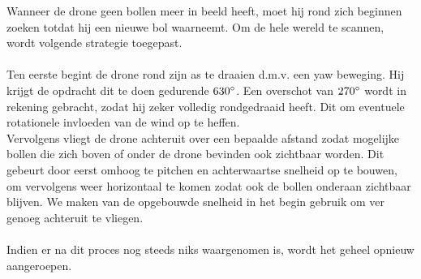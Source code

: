 \noindent
Wanneer de drone geen bollen meer in beeld heeft, moet hij rond zich beginnen zoeken totdat hij een nieuwe bol waarneemt. Om de hele wereld te scannen, wordt volgende strategie toegepast.
\\
\\
Ten eerste begint de drone rond zijn as te draaien d.m.v. een yaw beweging. Hij krijgt de opdracht dit te doen gedurende \(630\degree\). Een overschot van \(270\degree\) wordt in rekening gebracht, zodat hij zeker volledig rondgedraaid heeft. Dit om eventuele rotationele invloeden van de wind op te heffen.
\\
Vervolgens vliegt de drone achteruit over een bepaalde afstand zodat mogelijke bollen die zich boven of onder de drone bevinden ook zichtbaar worden. Dit gebeurt door eerst omhoog te pitchen en achterwaartse snelheid op te bouwen, om vervolgens weer horizontaal te komen zodat ook de bollen onderaan zichtbaar blijven. We maken van de opgebouwde snelheid in het begin gebruik om ver genoeg achteruit te vliegen.
\\
\\
Indien er na dit proces nog steeds niks waargenomen is, wordt het geheel opnieuw aangeroepen. 